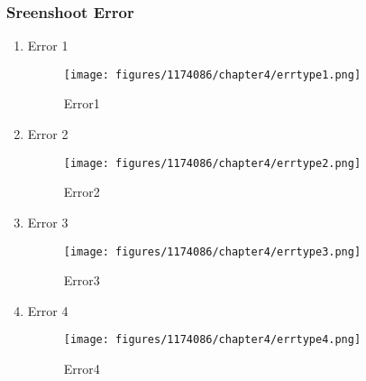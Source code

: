         \subsubsection{Sreenshoot Error}
        \begin{enumerate}
            \item Error 1
            \begin{figure}[H]
                \texttt{[image: figures/1174086/chapter4/errtype1.png]}
                \centering
                \caption{Error1}
            \end{figure}
            \item Error 2
            \begin{figure}[H]
                \texttt{[image: figures/1174086/chapter4/errtype2.png]}
                \centering
                \caption{Error2}
            \end{figure}
            \item Error 3
            \begin{figure}[H]
                \texttt{[image: figures/1174086/chapter4/errtype3.png]}
                \centering
                \caption{Error3}
            \end{figure}
            \item Error 4
            \begin{figure}[H]
                \texttt{[image: figures/1174086/chapter4/errtype4.png]}
                \centering
                \caption{Error4}
            \end{figure}
        \end{enumerate}
